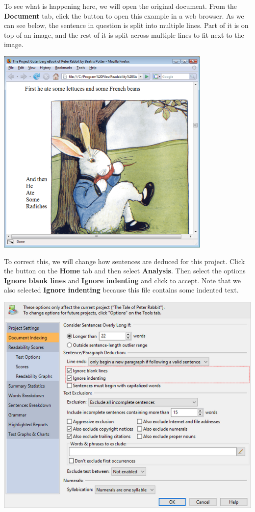 \documentclass[
]{book}
\theoremstyle{definition}
\theoremstyle{definition}
\theoremstyle{definition}
\theoremstyle{definition}
\theoremstyle{remark}
\begin{document}
To see what is happening here, we will open the original document. From the \textbf{Document} tab, click the  button to open this example in a web browser. As we can see below, the sentence in question is split into multiple lines. Part of it is on top of an image, and the rest of it is split across multiple lines to fit next to the image.

\begin{center}\includegraphics[width=0.75\linewidth,]{Images/NonGenerated/PeterRabbitBrowser} \end{center}

To correct this, we will change how sentences are deduced for this project. Click the  button on the \textbf{Home} tab and then select \textbf{Analysis}. Then select the options \textbf{Ignore blank lines} and \textbf{Ignore indenting} and click  to accept. Note that we also selected \textbf{Ignore indenting} because this file contains some indented text.

\includegraphics{Images/IgnoreBlankLines.png}
\end{document}
